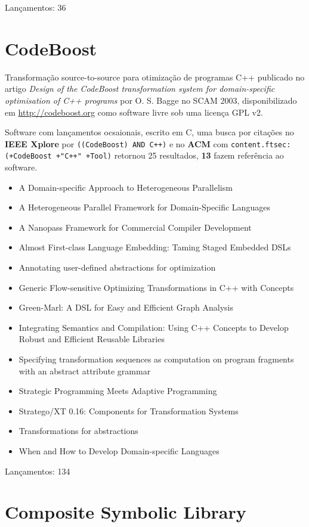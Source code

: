Lançamentos: 36

\section{CodeBoost}

Transformação source-to-source para otimização de programas C++
publicado no artigo {\it Design of the CodeBoost transformation system for domain-specific optimisation of C++ programs}
por O. S. Bagge
no SCAM 2003,
disponibilizado em \url{http://codeboost.org}
como software livre
sob uma licença GPL v2.

Software com lançamentos ocsaionais,
escrito em C,
uma busca por citações no {\bf IEEE Xplore} por
\texttt{((CodeBoost) AND C++)}
e no {\bf ACM} com
\texttt{content.ftsec:(+CodeBoost +"C++" +Tool)}
retornou
25 resultados,
{\bf 13} fazem referência ao software.

\begin{itemize}
\item A Domain-specific Approach to Heterogeneous Parallelism
\item A Heterogeneous Parallel Framework for Domain-Specific Languages
\item A Nanopass Framework for Commercial Compiler Development
\item Almost First-class Language Embedding: Taming Staged Embedded DSLs
\item Annotating user-defined abstractions for optimization
\item Generic Flow-sensitive Optimizing Transformations in C++ with Concepts
\item Green-Marl: A DSL for Easy and Efficient Graph Analysis
\item Integrating Semantics and Compilation: Using C++ Concepts to Develop Robust and Efficient Reusable Libraries
\item Specifying transformation sequences as computation on program fragments with an abstract attribute grammar
\item Strategic Programming Meets Adaptive Programming
\item Stratego/XT 0.16: Components for Transformation Systems
\item Transformations for abstractions
\item When and How to Develop Domain-specific Languages
\end{itemize}

Lançamentos: 134

\section{Composite Symbolic Library}

